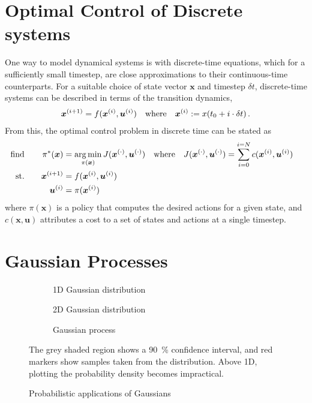 \documentclass[main.tex]{subfiles}
\begin{document}
\section{Optimal Control of Discrete systems}
	One way to model dynamical systems is with discrete-time equations, which for a sufficiently small timestep, are close approximations to their continuous-time counterparts.
	For a suitable choice of state vector $\bm{x}$ and timestep $\delta t$, discrete-time systems can be described in terms of the transition dynamics,
	\begin{align}
		\bm{x}^{(i + 1)} = f(\bm{x}^{(i)}, \bm{u}^{(i)}) \quad \text{where} \quad \bm{x}^{(i)} := x(t_0 + i\cdot\delta t)\,. \label{eq:transition}
	\end{align}
	From this, the optimal control problem in discrete time can be stated as
	\begin{alignat}{2}
		\text{find}&& \quad
			\pi^*(\bm{x}) &= \operatorname*{arg\,min}_{\pi(\bm{x})}
				J(\bm{x}^{(\cdot)}, \bm{u}^{(\cdot)})
				\quad \text{where} \quad
				J(\bm{x}^{(\cdot)}, \bm{u}^{(\cdot)}) = \sum_{i=0}^{i=N} c(\bm{x}^{(i)}, \bm{u}^{(i)})\quad \\ \label{eq:optimal}
		\text{st.}&& \quad
			\bm{x}^{(i+1)} &= f(\bm{x}^{(i)}, \bm{u}^{(i)}) \\ \nonumber
		&&
			\bm{u}^{(i)} &= \pi(\bm{x}^{(i)})\, \nonumber
	\end{alignat}
	where $\pi(\bm{x})$ is a policy that computes the desired actions for a given state, and $c(\bm{x}, \bm{u})$ attributes a cost to a set of states and actions at a single timestep.

\section{Gaussian Processes}

	\begin{figure}[b]
		\centering
		\begin{subfigure}[t]{0.3\linewidth}
			
			\caption{1D Gaussian distribution}
			\label{fig:gaussian:1d}
		\end{subfigure}%
		\hfill
		\begin{subfigure}[t]{0.3\linewidth}
			
			\caption{2D Gaussian distribution}
			\label{fig:gaussian:2d}
		\end{subfigure}%
		\hfill
		\begin{subfigure}[t]{0.3\linewidth}
			
			\caption{Gaussian process}
			\label{fig:gaussian:proc}
		\end{subfigure}%
		\caption{Probabilistic applications of Gaussians}
		\medskip
		\small
		The grey shaded region shows a \SI{90}{\percent} confidence interval, and red markers show samples taken from the distribution. Above 1D, plotting the probability density becomes impractical.
	\end{figure}
\end{document}
